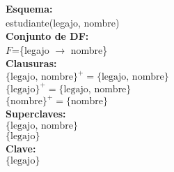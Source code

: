 \documentclass[preview]{standalone}
\begin{document}
\textbf{Esquema:}\\
estudiante(legajo, nombre)\\

\textbf{Conjunto de DF:}\\
$F$=\{legajo $\rightarrow$ nombre\}\\

\textbf{Clausuras:}\\
$\{\text{legajo, nombre}\}^+ =\big\{\text{legajo, nombre}\big\}$\\
$\{\text{legajo}\}^+ = \big\{\text{legajo, nombre}\big\}$\\
$\{\text{nombre}\}^+ = \big\{\text{nombre}\big\}$\\

\textbf{Superclaves: } \\
$\big\{\text{legajo, nombre}\big\}$\\ 
$\big\{\text{legajo}\big\}$\\

\textbf{Clave: }\\ 
$\big\{\text{legajo}\big\}$
\end{document}
